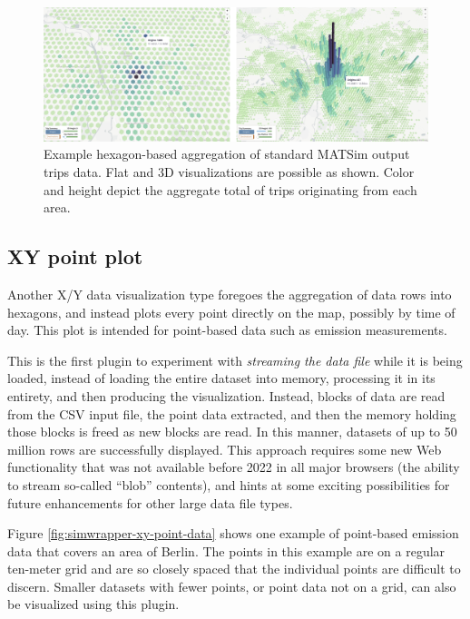 \begin{figure}[ht]
  \centering
  \includegraphics[width=0.95\linewidth]{chapters/31-simwrapper/images/xy-hexagons.jpg}
  \caption{Example hexagon-based aggregation of standard MATSim output trips data. Flat and 3D visualizations are possible as shown. Color and height depict the aggregate total of trips originating from each area. }
  \label{fig:simwrapper-xy-hexagons}
\end{figure}

\hypertarget{simwrapper-xyt-plots}{%
\subsection{XY point plot}\label{simwrapper-xy-point-plots}}

Another X/Y data visualization type foregoes the aggregation of data rows into hexagons, and instead plots every point directly on the map, possibly by time of day. This plot is intended for point-based data such as emission measurements.

This is the first plugin to experiment with \emph{streaming the data file} while it is being loaded, instead of loading the entire dataset into memory, processing it in its entirety, and then producing the visualization. Instead, blocks of data are read from the CSV input file, the point data extracted, and then the memory holding those blocks is freed as new blocks are read. In this manner, datasets of up to 50 million rows are successfully displayed. This approach requires some new Web functionality that was not available before 2022 in all major browsers (the ability to stream so-called ``blob'' contents), and hints at some exciting possibilities for future enhancements for other large data file types.

Figure \ref{fig:simwrapper-xy-point-data} shows one example of point-based emission data that covers an area of Berlin. The points in this example are on a regular ten-meter grid and are so closely spaced that the individual points are difficult to discern. Smaller datasets with fewer points, or point data not on a grid, can also be visualized using this plugin.

